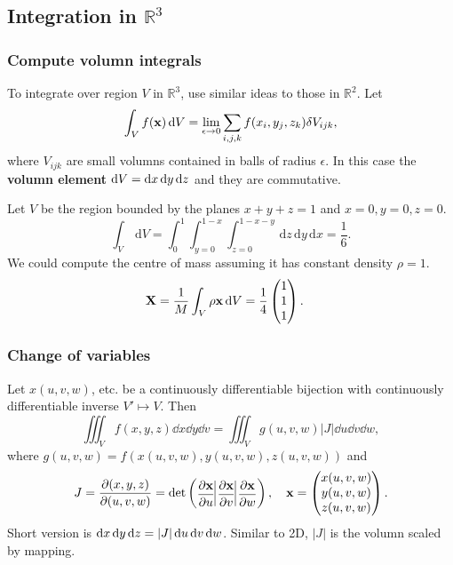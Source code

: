 \subsection{Integration in $ \mathbb{R}^{3} $}
\subsubsection{Compute volumn integrals}

To integrate over region $V$ in $ \mathbb{R}^{3}$, use similar ideas to those in $ \mathbb{R}^{2} $. Let 
\[
    \int_{V} f({\bf x}) \,\mathrm{d}V = \lim_{\epsilon \to 0} \sum_{i,j,k} f(x_i,y_j,z_k)\delta V_{ijk},
\]
where $ V_{ijk} $ are small volumns contained in balls of radius $\epsilon$. In this case the \textbf{volumn element} $ \mathrm{d} V = \mathrm{d} x\,\mathrm{d} y\,\mathrm{d} z $ and they are commutative.

\begin{example}
    Let $V$ be the region bounded by the planes $ x+y+z=1 $ and $ x=0,y=0,z=0 $.
    \[
        \int_{V} \,\mathrm{d}V = \int_{0}^{1} \int_{y=0}^{1-x} \int_{z=0}^{1-x-y}  \,\mathrm{d}z \,\mathrm{d}y \,\mathrm{d}x
        = \frac{1}{6}.
    \]
    We could compute the centre of mass assuming it has constant density $ \rho=1 $. 
    \begin{align*}
        {\bf X} &= \frac{1}{M} \int_{V} \rho{\bf x} \,\mathrm{d}V = \frac{1}{4}\begin{pmatrix}
            1 \\ 1 \\ 1
        \end{pmatrix}.
    \end{align*}
\end{example}

\subsubsection{Change of variables}
\begin{proposition}
    Let $ x(u,v,w) $, etc. be a continuously differentiable bijection with continuously differentiable inverse $ V'\mapsto V $. Then 
    \[
        \iiint_{V} f(x,y,z)\dd x\dd y\dd v = \iiint_{V} g(u,v,w)|J|\dd u\dd v\dd w,
    \]
    where $ g(u,v,w)= f(x(u,v,w),y(u,v,w),z(u,v,w))$ and
    \[
        J = \frac{\partial (x,y,z)}{\partial (u,v,w)} = \det \left(\!\!\! \begin{array}{c|c|c}
           \displaystyle \frac{\partial \bfx}{\partial u}\!\!\!&\!\!\displaystyle\frac{\partial \bfx}{\partial v}\!\!\!&\!\!\displaystyle\frac{\partial\bfx}{\partial w}
        \end{array}\!\!\! \right),\quad \bfx = \begin{pmatrix}
            x(u,v,w) \\ y(u,v,w) \\ z(u,v,w)
        \end{pmatrix}.
    \]
    Short version is $ \mathrm{d} x\,\mathrm{d} y\,\mathrm{d} z = |J|\,\mathrm{d} u\,\mathrm{d} v\,\mathrm{d} w $. Similar to 2D, $|J|$ is the volumn scaled by mapping.
\end{proposition}

